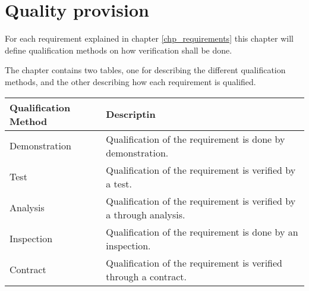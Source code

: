 \label{chp_qualityProvision}
\chapter{Quality provision}
For each requirement explained in chapter \ref{chp_requirements} this chapter will define qualification methods on how verification shall be done.

The chapter contains two tables, one for describing the different qualification methods, and the other describing how each requirement is qualified.

\begin{longtable}{| p{4.2cm}  | p{7.8cm} |  }
	\hline
	\textbf{Qualification Method}	& \textbf{Descriptin} \\ \hline
	Demonstration					& Qualification of the requirement is done by demonstration. \\ \hline
	Test							& Qualification of the requirement is verified by a test.\\ \hline
	Analysis						& Qualification of the requirement is verified by a through analysis. \\ \hline
	Inspection						& Qualification of the requirement is done by an inspection. \\ \hline
	Contract						& Qualification of the requirement is verified through a contract. \\ \hline
\end{longtable}

